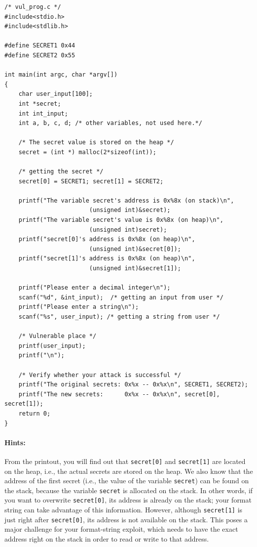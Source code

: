 \begin{lstlisting}
/* vul_prog.c */
#include<stdio.h>
#include<stdlib.h>

#define SECRET1 0x44
#define SECRET2 0x55

int main(int argc, char *argv[])
{
    char user_input[100];
    int *secret;
    int int_input;
    int a, b, c, d; /* other variables, not used here.*/
    
    /* The secret value is stored on the heap */
    secret = (int *) malloc(2*sizeof(int));
    
    /* getting the secret */
    secret[0] = SECRET1; secret[1] = SECRET2;
    
    printf("The variable secret's address is 0x%8x (on stack)\n", 
                        (unsigned int)&secret);
    printf("The variable secret's value is 0x%8x (on heap)\n", 
                        (unsigned int)secret);
    printf("secret[0]'s address is 0x%8x (on heap)\n", 
                        (unsigned int)&secret[0]);
    printf("secret[1]'s address is 0x%8x (on heap)\n", 
                        (unsigned int)&secret[1]);
    
    printf("Please enter a decimal integer\n");
    scanf("%d", &int_input);  /* getting an input from user */
    printf("Please enter a string\n");
    scanf("%s", user_input); /* getting a string from user */
    
    /* Vulnerable place */
    printf(user_input);
    printf("\n");
    
    /* Verify whether your attack is successful */
    printf("The original secrets: 0x%x -- 0x%x\n", SECRET1, SECRET2);
    printf("The new secrets:      0x%x -- 0x%x\n", secret[0], secret[1]);
    return 0;
}
\end{lstlisting}


\paragraph{Hints:}
From the printout, you will find out that {\tt secret[0]} and 
{\tt secret[1]} are located on the heap, i.e., the actual
secrets are stored on the heap. We also know that 
the address of the first secret (i.e., the value of 
the variable {\tt secret}) can be found on the stack, because
the variable {\tt secret} is allocated on the stack. 
In other words, if you want to overwrite {\tt secret[0]}, its address 
is already on the stack; your format string can  take advantage 
of this information. However, although {\tt secret[1]} is just
right after {\tt secret[0]}, its address is not available on the 
stack. This poses a major challenge for your format-string exploit, 
which needs to have the exact address right on the stack in order 
to read or write to that address.
 


